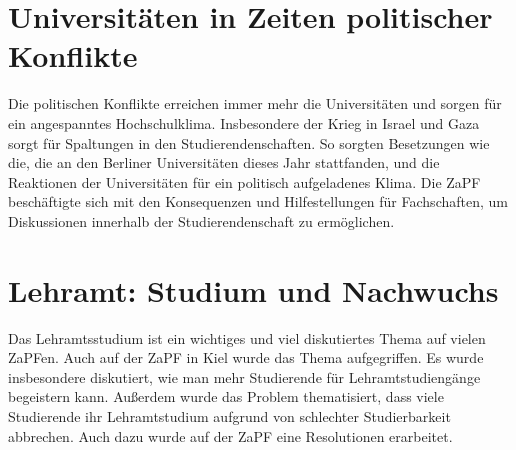 \documentclass{scrartcl}
\begin{document}
\section*{Universitäten in Zeiten politischer Konflikte}
Die politischen Konflikte erreichen immer mehr die Universitäten und sorgen für ein angespanntes Hochschulklima. Insbesondere der Krieg in Israel und Gaza sorgt für Spaltungen in den Studierendenschaften. So sorgten Besetzungen wie die, die an den Berliner Universitäten dieses Jahr stattfanden, und die Reaktionen der Universitäten für ein politisch aufgeladenes Klima. Die ZaPF beschäftigte sich mit den Konsequenzen und Hilfestellungen für Fachschaften, um Diskussionen innerhalb der Studierendenschaft zu ermöglichen.

\section*{Lehramt: Studium und Nachwuchs}
Das Lehramtsstudium ist ein wichtiges und viel diskutiertes Thema auf vielen ZaPFen. Auch auf der ZaPF in Kiel wurde das Thema aufgegriffen. Es wurde insbesondere diskutiert, wie man mehr Studierende für Lehramtstudiengänge begeistern kann. Außerdem wurde das Problem thematisiert, dass viele Studierende ihr Lehramtstudium aufgrund von schlechter Studierbarkeit abbrechen. Auch dazu wurde auf der ZaPF eine Resolutionen erarbeitet.
\end{document}
